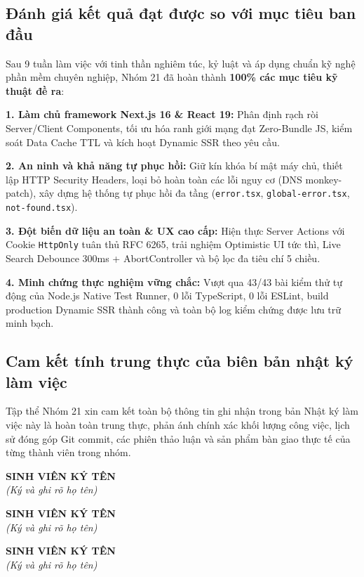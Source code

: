\documentclass[12pt,a4paper]{extarticle}
\begin{document}
\subsection{Đánh giá kết quả đạt được so với mục tiêu ban đầu}

Sau 9 tuần làm việc với tinh thần nghiêm túc, kỷ luật và áp dụng chuẩn kỹ nghệ phần mềm chuyên nghiệp, Nhóm 21 đã hoàn thành \textbf{100\% các mục tiêu kỹ thuật đề ra}:

\textbf{1. Làm chủ framework Next.js 16 \& React 19:} Phân định rạch ròi Server/Client Components, tối ưu hóa ranh giới mạng đạt Zero-Bundle JS, kiểm soát Data Cache TTL và kích hoạt Dynamic SSR theo yêu cầu.

\textbf{2. An ninh và khả năng tự phục hồi:} Giữ kín khóa bí mật máy chủ, thiết lập HTTP Security Headers, loại bỏ hoàn toàn các lỗi nguy cơ (DNS monkey-patch), xây dựng hệ thống tự phục hồi đa tầng (\texttt{error.tsx}, \texttt{global-error.tsx}, \texttt{not-found.tsx}).

\textbf{3. Đột biến dữ liệu an toàn \& UX cao cấp:} Hiện thực Server Actions với Cookie \texttt{HttpOnly} tuân thủ RFC 6265, trải nghiệm Optimistic UI tức thì, Live Search Debounce 300ms + AbortController và bộ lọc đa tiêu chí 5 chiều.

\textbf{4. Minh chứng thực nghiệm vững chắc:} Vượt qua 43/43 bài kiểm thử tự động của Node.js Native Test Runner, 0 lỗi TypeScript, 0 lỗi ESLint, build production Dynamic SSR thành công và toàn bộ log kiểm chứng được lưu trữ minh bạch.

\subsection{Cam kết tính trung thực của biên bản nhật ký làm việc}

Tập thể Nhóm 21 xin cam kết toàn bộ thông tin ghi nhận trong bản Nhật ký làm việc này là hoàn toàn trung thực, phản ánh chính xác khối lượng công việc, lịch sử đóng góp Git commit, các phiên thảo luận và sản phẩm bàn giao thực tế của từng thành viên trong nhóm.

\vspace{0.8cm}

\noindent
\begin{minipage}[t]{0.32\textwidth}
\centering
\textbf{SINH VIÊN KÝ TÊN}\\[0.15cm]
\textit{(Ký và ghi rõ họ tên)}\\[3.2cm]
\end{minipage}
\hfill
\begin{minipage}[t]{0.32\textwidth}
\centering
\textbf{SINH VIÊN KÝ TÊN}\\[0.15cm]
\textit{(Ký và ghi rõ họ tên)}\\[3.2cm]
\end{minipage}
\hfill
\begin{minipage}[t]{0.32\textwidth}
\centering
\textbf{SINH VIÊN KÝ TÊN}\\[0.15cm]
\textit{(Ký và ghi rõ họ tên)}\\[3.2cm]
\end{minipage}
\end{document}
